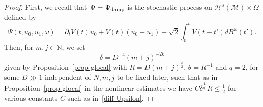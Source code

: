 \documentclass[AHL,Unicode,longabstracts,published]{cedram}
\newcommand{\damp}{\textup{damp}}
\newcommand{\N}{\mathbb{N}}
\newcommand{\M}{\mathcal{M}}
\renewcommand{\H}{\mathcal{H}}
\newcommand{\dl}{\delta}
\newcommand{\dt}{\partial_t}
\renewcommand{\o}{\omega}
\renewcommand{\O}{\Omega}
\begin{document}
\begin{proof}
First, we recall that $\Psi=\Psi_{\damp}$ is the stochastic process on $\H^s(\M)\times\O$ defined by
\begin{equation*}
\Psi(t,u_0,u_1,\o) = \dt V(t)u_0 + V(t)(u_0+u_1) + \sqrt{2}\int_{0}^tV(t-t')dB^\o(t').
\end{equation*}
Then, for $m,j\in \N$, we set
\begin{equation}\label{dlmj}
\dl = D^{-4}(m+j)^{-2k}
\end{equation}
given by Proposition~\ref{prop-glocal} with $R=D(m+j)^{\frac{k}2}$, $\theta = R^{-1}$ and $q=2$, for some $D\gg 1$ independent of $N,m,j$ to be fixed later, such that as in Proposition~\ref{prop-glocal} in the nonlinear estimates we have $C\dl^{\frac1{q'}}R \le \frac12$ for various constants $C$ such as in~\eqref{diff-Upsilon}.


\end{proof}
\end{document}
